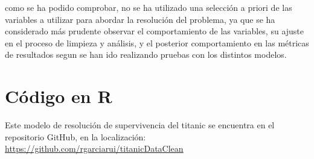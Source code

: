 \documentclass[]{article}
\begin{document}
como se ha podido comprobar, no se ha utilizado una selección a priori
de las variables a utilizar para abordar la resolución del problema, ya
que se ha considerado más prudente observar el comportamiento de las
variables, su ajuste en el proceso de limpieza y análisis, y el
posterior comportamiento en las métricas de resultados segun se han ido
realizando pruebas con los distintos modelos.

\section{Código en R}\label{codigo-en-r}

Este modelo de resolución de supervivencia del titanic se encuentra en
el repositorio GitHub, en la localización:
\url{https://github.com/rgarciarui/titanicDataClean}
\end{document}
